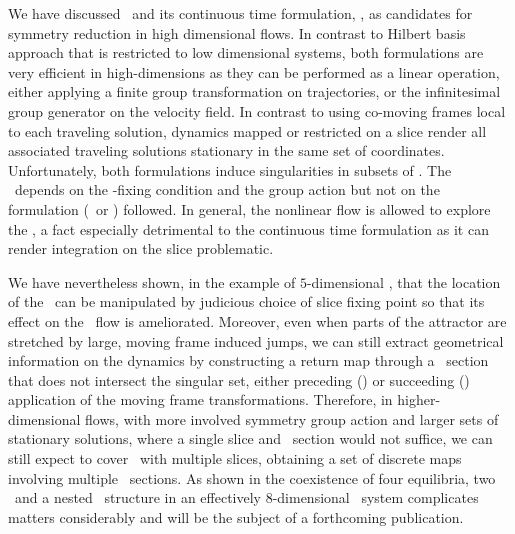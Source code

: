We have discussed \mframes\ and its continuous time
formulation, \mslices, as candidates for symmetry reduction
in high dimensional flows. In contrast to Hilbert basis
approach that is restricted to low dimensional systems, both
formulations are very efficient in high-dimensions as they
can be performed as a linear operation, either applying a
finite group transformation on trajectories, or the
infinitesimal group generator on the velocity field. In
contrast to using co-moving frames local to each traveling
solution, dynamics mapped or restricted on a slice render all
associated traveling solutions stationary in the same set of
coordinates. Unfortunately, both formulations induce
singularities in subsets of \reducedsp. The \sset\ depends on
the \slice-fixing condition and the group action but not on
the formulation (\mslices\ or \mframes) followed. In general,
the nonlinear flow is allowed to explore the \sset, a fact
especially detrimental to the continuous time formulation as
it can render integration on the slice problematic.


We have nevertheless shown, in the example of $5$-dimensional
\cLe, that the location of the \sset\ can be manipulated by
judicious choice of slice fixing point so that its effect on
the \reducedsp\ flow is ameliorated. Moreover, even when
parts of the attractor are stretched by large, moving frame
induced jumps, we can still extract geometrical information
on the dynamics by constructing a return map through a
\Poincare\ section that does not intersect the singular set,
either preceding () or succeeding
() application of the moving frame
transformations. Therefore, in higher-dimensional flows, with
more involved symmetry group action and larger sets of
stationary solutions, where a single slice and \Poincare\
section would not suffice, we can still expect to cover
\reducedsp\ with multiple slices, obtaining a set of discrete
maps involving multiple \Poincare\ sections. As shown in
 the coexistence of four equilibria,
two \reqva\ and a nested \fixedsp\ structure in an
effectively $8$-dimensional \KS\ system complicates
matters considerably and will be the subject of a forthcoming
publication.
